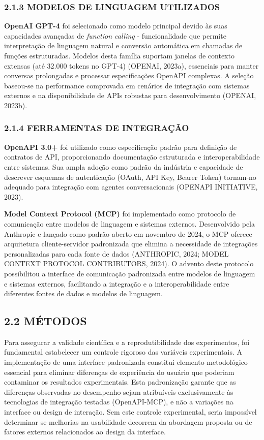 \documentclass[
]{article}
\begin{document}
\subsubsection{2.1.3 MODELOS DE LINGUAGEM
UTILIZADOS}\label{modelos-de-linguagem-utilizados}

\textbf{OpenAI GPT-4} foi selecionado como modelo principal devido às
suas capacidades avançadas de \emph{function calling} - funcionalidade
que permite interpretação de linguagem natural e conversão automática em
chamadas de funções estruturadas. Modelos desta família suportam janelas
de contexto extensas (até 32.000 tokens no GPT-4) (OPENAI, 2023a),
essenciais para manter conversas prolongadas e processar especificações
OpenAPI complexas. A seleção baseou-se na performance comprovada em
cenários de integração com sistemas externos e na disponibilidade de
APIs robustas para desenvolvimento (OPENAI, 2023b).

\subsubsection{2.1.4 FERRAMENTAS DE
INTEGRAÇÃO}\label{ferramentas-de-integrauxe7uxe3o}

\textbf{OpenAPI 3.0+} foi utilizado como especificação padrão para
definição de contratos de API, proporcionando documentação estruturada e
interoperabilidade entre sistemas. Sua ampla adoção como padrão da
indústria e capacidade de descrever esquemas de autenticação (OAuth, API
Key, Bearer Token) tornam-no adequado para integração com agentes
conversacionais (OPENAPI INITIATIVE, 2023).

\textbf{Model Context Protocol (MCP)} foi implementado como protocolo de
comunicação entre modelos de linguagem e sistemas externos. Desenvolvido
pela Anthropic e lançado como padrão aberto em novembro de 2024, o MCP
oferece arquitetura cliente-servidor padronizada que elimina a
necessidade de integrações personalizadas para cada fonte de dados
(ANTHROPIC, 2024; MODEL CONTEXT PROTOCOL CONTRIBUTORS, 2024). O advento
deste protocolo possibilitou a interface de comunicação padronizada
entre modelos de linguagem e sistemas externos, facilitando a integração
e a interoperabilidade entre diferentes fontes de dados e modelos de
linguagem.

\subsection{2.2 MÉTODOS}\label{muxe9todos}

Para assegurar a validade científica e a reprodutibilidade dos
experimentos, foi fundamental estabelecer um controle rigoroso das
variáveis experimentais. A implementação de uma interface padronizada
constitui elemento metodológico essencial para eliminar diferenças de
experiência do usuário que poderiam contaminar os resultados
experimentais. Esta padronização garante que as diferenças observadas no
desempenho sejam atribuíveis exclusivamente às tecnologias de integração
testadas (OpenAPI-MCP), e não a variações na interface ou design de
interação. Sem este controle experimental, seria impossível determinar
se melhorias na usabilidade decorrem da abordagem proposta ou de fatores
externos relacionados ao design da interface.
\end{document}
